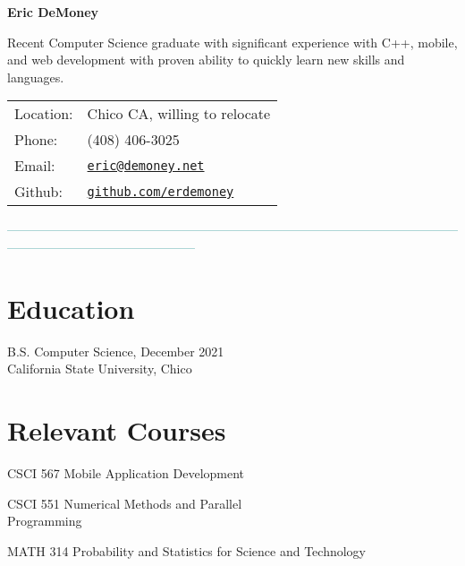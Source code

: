 \documentclass[letterpaper]{article}
\def\name{Eric DeMoney}
\renewenvironment{itemize}{
  \begin{list}{}{
    \setlength{\leftmargin}{1.5em}
  }
}{
  \end{list}
}
\begin{document}
{\textbf{\huge \name}

\vspace{0.05in}

\begin{minipage}{0.475\linewidth}
   Recent Computer Science graduate with significant experience with C++, mobile, and web development with proven ability to quickly learn new skills and\\languages. 
\end{minipage}
\hspace{0.125cm}
\begin{minipage}{0.475\linewidth}
  \begin{tabular}{ll}
    Location: & Chico CA, willing to relocate\\
    Phone: & (408) 406-3025\\
    Email: & \href{mailto:eric@demoney.net}{\tt eric@demoney.net}\\
    Github: & \href{https://github.com/erdemoney}{\tt github.com/erdemoney}\\
  \end{tabular}
\end{minipage}

\vspace{0.1in}
\textcolor{teal}{---------------------------------------------------------------------------------------------------------------------------------------------------------}

\begin{minipage}[t]{0.475\linewidth}
    \section*{Education}
    \begin{itemize}
    \item[$\bullet$] B.S. Computer Science, December 2021\\
        California State University, Chico
    \end{itemize}
    \section*{Relevant Courses}
    \begin{itemize}
        \item[$\bullet$] CSCI 567 Mobile Application Development
        \item[$\bullet$] CSCI 551 Numerical Methods and Parallel\\Programming
        \item[$\bullet$] MATH 314 Probability and Statistics for Science and Technology
    \end{itemize}
\end{minipage}
\hspace{0.5cm}
\begin{minipage}[t]{0.475\linewidth}

\end{minipage}}
\end{document}
